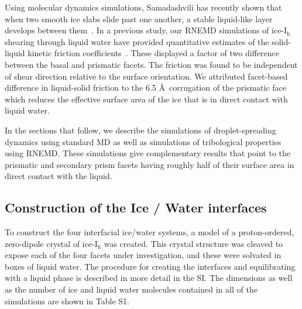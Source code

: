 \documentclass{pnastwo}
\begin{document}
\begin{article}

Using molecular dynamics simulations, Samadashvili has recently shown
that when two smooth ice slabs slide past one another, a stable
liquid-like layer develops between them~\cite{Samadashvili13}. In a
previous study, our RNEMD simulations of ice-I$_\mathrm{h}$ shearing
through liquid water have provided quantitative estimates of the
solid-liquid kinetic friction coefficients~\cite{Louden13}. These
displayed a factor of two difference between the basal and prismatic
facets.  The friction was found to be independent of shear direction
relative to the surface orientation.  We attributed facet-based
difference in liquid-solid friction to the 6.5 \AA\ corrugation of the
prismatic face which reduces the effective surface area of the ice
that is in direct contact with liquid water.

In the sections that follow, we describe the simulations of
droplet-spreading dynamics using standard MD as well as simulations of
tribological properties using RNEMD.  These simulations give
complementary results that point to the prismatic and secondary prism
facets having roughly half of their surface area in direct contact
with the liquid.

\subsection{Construction of the Ice / Water interfaces}
To construct the four interfacial ice/water systems, a model of a
proton-ordered, zero-dipole crystal of ice-I$_\mathrm{h}$ was created.
This crystal structure was cleaved to expose each of the four facets
under investigation, and these were solvated in boxes of liquid water.
The procedure for creating the interfaces and equilibrating with a
liquid phase is described in more detail in the SI. The dimensions as
well as the number of ice and liquid water molecules contained in all
of the simulations are shown in Table S1.


\end{article}
\end{document}
